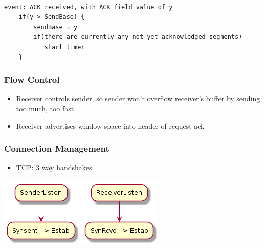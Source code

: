 \documentclass[11pt]{article}
\begin{document}
\begin{verbatim}

event: ACK received, with ACK field value of y 
	if(y > SendBase) {
	    sendBase = y
	    if(there are currently any not yet acknowledged segments)
	       start timer
	}

\end{verbatim}

\subsubsection{Flow Control}
\label{sec:org6efb633}
\begin{itemize}
\item Receiver controls sender, so sender won't overflow receiver's buffer
by sending too much, too fast
\item Receiver advertises window space into header of request ack
\end{itemize}

\subsubsection{Connection Management}
\label{sec:org94138e8}
\begin{itemize}
\item TCP: 3 way handshakes
\end{itemize}

\begin{center}
\includegraphics[width=.9\linewidth]{connectionManagement.png}
\end{center}
\end{document}
